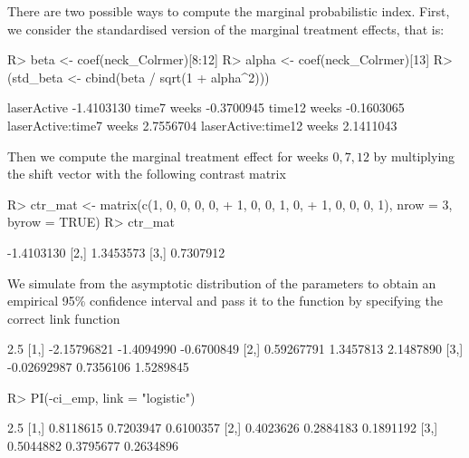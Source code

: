 \documentclass[article,nojss,shortnames]{jss}\usepackage[]{graphicx}\usepackage[]{xcolor}
\begin{document}
There are two possible ways to compute the marginal probabilistic index.
First, we consider the standardised version of the marginal treatment effects,
that is:
\begin{Schunk}
\begin{Sinput}
R> beta <- coef(neck_Colrmer)[8:12]
R> alpha <- coef(neck_Colrmer)[13]
R> (std_beta <- cbind(beta / sqrt(1 + alpha^2)))
\end{Sinput}
\begin{Soutput}
                               [,1]
laserActive              -1.4103130
time7 weeks              -0.3700945
time12 weeks             -0.1603065
laserActive:time7 weeks   2.7556704
laserActive:time12 weeks  2.1411043
\end{Soutput}
\end{Schunk}
Then we compute the marginal treatment effect for weeks $0, 7, 12$ by multiplying
the shift vector with the following contrast matrix
\begin{Schunk}
\begin{Sinput}
R> ctr_mat <- matrix(c(1, 0, 0, 0, 0,
+                      1, 0, 0, 1, 0,
+                      1, 0, 0, 0, 1), nrow = 3, byrow = TRUE)
R> ctr_mat %*% std_beta
\end{Sinput}
\begin{Soutput}
           [,1]
[1,] -1.4103130
[2,]  1.3453573
[3,]  0.7307912
\end{Soutput}
\end{Schunk}
We simulate from the asymptotic distribution of the parameters to obtain an
empirical 95\% confidence interval and pass it to the  function by
specifying the correct link function
\begin{Schunk}
\begin{Soutput}
            2.5%        50%      97.5%
[1,] -2.15796821 -1.4094990 -0.6700849
[2,]  0.59267791  1.3457813  2.1487890
[3,] -0.02692987  0.7356106  1.5289845
\end{Soutput}
\begin{Sinput}
R> PI(-ci_emp, link = "logistic")
\end{Sinput}
\begin{Soutput}
          2.5%       50%     97.5%
[1,] 0.8118615 0.7203947 0.6100357
[2,] 0.4023626 0.2884183 0.1891192
[3,] 0.5044882 0.3795677 0.2634896
\end{Soutput}
\end{Schunk}
\end{document}
